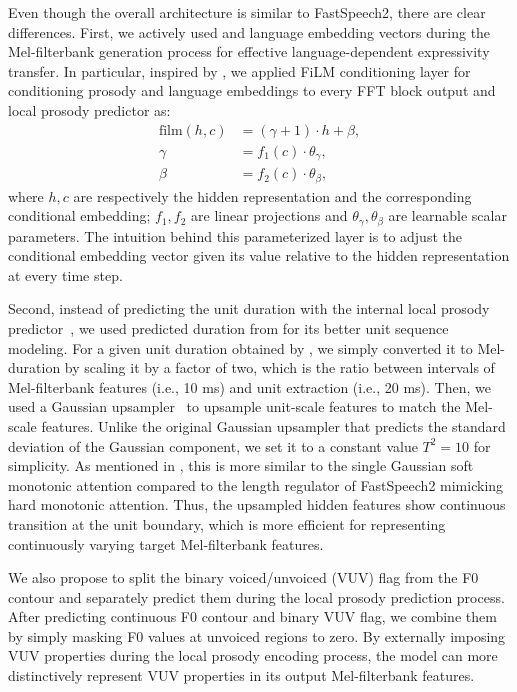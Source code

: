 Even though the overall architecture is similar to FastSpeech2, there are clear differences.
First, we actively used \ptvemb and language embedding vectors during the Mel-filterbank generation process for effective language-dependent expressivity transfer.
In particular, inspired by \citet{Za_di_2022}, we applied FiLM conditioning layer \citep{perez2018film, boris2018tadam} for conditioning prosody and language embeddings to every FFT block output and local prosody predictor as:
\begin{align}\label{eq:expressive:film}
    \nonumber \text{film}(h,c) &= (\gamma+1) \cdot h + \beta, \\ 
    \gamma &= f_1(c) \cdot \theta_{\gamma},\\
    \nonumber \beta &= f_2(c) \cdot \theta_{\beta},
\end{align}
where $h,c$ are respectively the hidden representation and the corresponding conditional embedding; $f_1,f_2$ are linear projections and $\theta_{\gamma}, \theta_{\beta}$ are learnable scalar parameters.
The intuition behind this parameterized layer is to adjust the conditional embedding vector given its value relative to the hidden representation at every time step.

Second, instead of predicting the unit duration with the internal local prosody predictor~\citep{ren2021fastspeech2}, we used predicted duration from \unitytwo for its better unit sequence modeling.
For a given unit duration obtained by \unitytwo, we simply converted it to Mel-duration by scaling it by a factor of two, which is the ratio between intervals of Mel-filterbank features (i.e., 10 ms) and unit extraction (i.e., 20 ms).
Then, we used a Gaussian upsampler~\citep{shen2020nonattentive} to upsample unit-scale features to match the Mel-scale features.
Unlike the original Gaussian upsampler that predicts the standard deviation of the Gaussian component, we set it to a constant value $T^2=10$ for simplicity.
As mentioned in \citet{shen2020nonattentive}, this is more similar to the single Gaussian soft monotonic attention compared to the length regulator of FastSpeech2 mimicking hard monotonic attention.
Thus, the upsampled hidden features show continuous transition at the unit boundary, which is more efficient for representing continuously varying target Mel-filterbank features.

We also propose to split the binary voiced/unvoiced (VUV) flag from the F0 contour and separately predict them during the local prosody prediction process.
After predicting continuous F0 contour and binary VUV flag, we combine them by simply masking F0 values at unvoiced regions to zero.
By externally imposing VUV properties during the local prosody encoding process, the model can more distinctively represent VUV properties in its output Mel-filterbank features.

